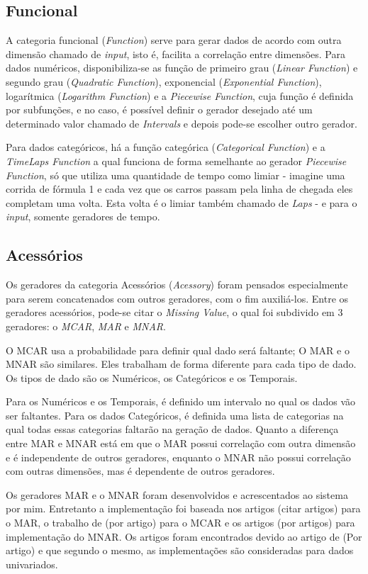 \documentclass[
	12pt,				%
	openright,			%
	twoside,			%
	a4paper,			%
	english,			%
	brazil				%
	]{abntex2}
\begin{document}
		\subsection{Funcional}
			A categoria funcional (\emph{Function}) serve para gerar dados de acordo com outra dimensão chamado de \emph{input}, isto é, facilita a correlação entre dimensões.
			Para dados numéricos, disponibiliza-se as 
				função de primeiro grau (\emph{Linear Function}) e 
				segundo grau (\emph{Quadratic Function}), 
				exponencial (\emph{Exponential Function}), 
				logarítmica (\emph{Logarithm Function}) e
				a \emph{Piecewise Function}, cuja função é definida por subfunções, e no caso, é possível definir o gerador desejado até um determinado valor chamado de \emph{Intervals} e depois pode-se escolher outro gerador.
			\par
			Para dados categóricos, há a função categórica (\emph{Categorical Function}) e 
			a \emph{TimeLaps Function} a qual funciona de forma semelhante ao gerador \emph{Piecewise Function}, só que utiliza uma quantidade de tempo como limiar - imagine uma corrida de fórmula 1 e cada vez que os carros passam pela linha de chegada eles completam uma volta. Esta volta é o limiar também chamado de \emph{Laps} - e para o \emph{input}, somente geradores de tempo.
		\subsection{Acessórios}
			Os geradores da categoria Acessórios (\emph{Acessory}) foram pensados especialmente para serem concatenados com outros geradores, com o fim auxiliá-los.
			Entre os geradores acessórios, pode-se citar o \emph{Missing Value}, o qual foi subdivido em 3 geradores: o \emph{MCAR}, \emph{MAR} e \emph{MNAR}.
			\par
			O MCAR usa a probabilidade para definir qual dado será faltante;
			O MAR e o MNAR são similares. 
			Eles trabalham de forma diferente para cada tipo de dado.
			Os tipos de dado são os Numéricos, os Categóricos e os Temporais.
			\par
			Para os Numéricos e os Temporais, é definido um intervalo no qual os dados vão ser faltantes.
			Para os dados Categóricos, é definida uma lista de categorias na qual todas essas categorias faltarão na geração de dados.
			Quanto a diferença entre MAR e MNAR está em que o MAR possui correlação com outra dimensão e é independente de outros geradores,
			 enquanto o MNAR não possui correlação com outras dimensões, mas é dependente de outros geradores.
			\par
			 Os geradores MAR e o MNAR foram desenvolvidos e acrescentados ao sistema por mim.
			 Entretanto a implementação foi baseada nos artigos (citar artigos) para o MAR,
			 o trabalho de (por artigo) para o MCAR e os artigos (por artigos) para implementação do MNAR.
			 Os artigos foram encontrados devido ao artigo de (Por artigo) e que segundo o mesmo, as implementações são consideradas para dados univariados.
			  
\end{document}

